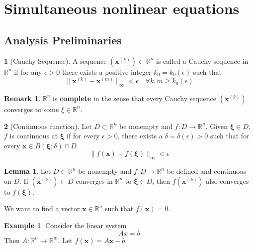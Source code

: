 \documentclass[12pt]{article}
\theoremstyle{definition}
\newtheorem{definition}{\color{NavyBlue}{\textbf{Definition}}}
\newcommand{\e}{\epsilon}
\newcommand{\R}{\mathbb{R}}
\newcommand{\norm}[1]{\lVert#1\rVert}
\newcommand{\x}{\bm{x}}
\newcommand{\xib}{\bm{\xi}}
\newtheorem{example}{\color{WildStrawberry}Example}
\newtheorem{lemma}{Lemma}
\newtheorem{remark}{Remark}
\theoremstyle{definition}
\begin{document}
\section{Simultaneous nonlinear equations}

\subsection{Analysis Preliminaries}
\begin{definition}[Cauchy Sequence]
A sequence $(\x^{(k)}) \subset \R^n$ is called a Cauchy sequence in $\R^n$ if for any $\e > 0$ there exists a positive integer $k_0 = k_0(\e)$ such that
\begin{equation}
	\norm{\x^{(k)} - \x^{(m)}}_{\infty} < \e \quad \forall k, m \geq k_0(\e)
\end{equation}
\end{definition}

\begin{remark}
$\R^n$ is \textbf{complete} in the sense that every Cauchy sequence $(\x^{(k)})$ converges to some $\xi \in \R^n$. 
\end{remark}

\begin{definition}[Continuous function]
Let $D \subset \R^n$ be nonempty and $f: D \to \R^n$. Given $\xib \in D$, $f$ is continuous at $\xib$ if for every $\e > 0$, there exists a $\delta = \delta(\e) > 0$ such that for every $\x \in B(\xib; \delta) \cap D$
\begin{equation}
 	\norm{f(\x) - f(\xib)}_\infty < \e
 \end{equation} 
\end{definition}

\begin{lemma}
Let $D \subset \R^n$ be nonempty and $f: D \to \R^n$ be defined and continuous on $D$. If $(\x^{(k)}) \subset D$ converges in $\R^n$ to $\xib \in D$, then $f(\x^{(k)})$ also converges to $f(\xib)$. 
\end{lemma}

We want to find a vector $\x\in \R^n$ such that $f(\x) = 0$.

\begin{example}
Consider the linear system
\begin{equation}
	Ax = b
\end{equation}
Then $A: \R^n \to \R^m$. Let $f(\bm x) = A\x - b$.
\end{example}
\end{document}
